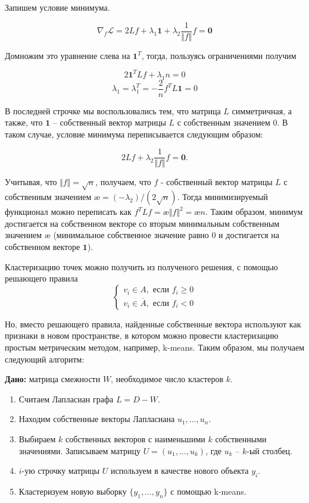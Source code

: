 \documentclass[12pt,a4paper]{article}
\begin{document}
Запишем условие минимума.

\begin{equation*}
	\nabla_f \mathcal{L} = 2Lf + \lambda_1 \mathbf{1} + \lambda_2 \frac{1}{\Vert f \Vert} f = \mathbf{0}
\end{equation*}

Домножим это уравнение слева на $\mathbf{1}^T$, тогда, пользуясь ограничениями получим

\begin{equation*}
	2\mathbf{1}^T Lf + \lambda_1 n = 0
\end{equation*}
\begin{equation*}
	\lambda_1 = \lambda_1^T = -\frac{2}{n} f^T L \mathbf{1} = 0
\end{equation*}

В последней строчке мы воспользовались тем, что матрица $L$ симметричная, а также, что $\mathbf{1}$ – собственный вектор матрицы $L$ с собственным значением $0$. В таком случае, условие минимума переписывается следующим образом:

\begin{equation*}
	2Lf + \lambda_2 \frac{1}{\Vert f \Vert} f = \mathbf{0}.
\end{equation*}

Учитывая, что $\Vert f \Vert = \sqrt{n}$, получаем, что $f$ - собственный вектор матрицы $L$ с собственным значением $æ = (-\lambda_2)/(2\sqrt{n})$. Тогда минимизируемый функционал можно переписать как $f^T L f = æ \Vert f \Vert^2 = æ n$. Таким образом, минимум достигается на собственном векторе со вторым минимальным собственным значением $æ$ (минимальное собственное значение равно $0$ и достигается на собственном векторе $\mathbf{1}$).

Кластеризацию точек можно получить из полученого решения, с помощью решающего правила
\begin{equation*}
	\begin{cases}
	v_i \in A, \text{ если } f_i \geq 0\\
	v_i \in \overline{A}, \text{ если } f_i < 0
	\end{cases}
\end{equation*}

Но, вместо решающего правила, найденные собственные вектора используют как признаки в новом пространстве, в котором можно провести кластеризацию простым метрическим методом, например, k-means. Таким образом, мы получаем следующий алгоритм:

\newpage
\textbf{Дано:} матрица смежности $W$, необходимое число кластеров $k$.
\begin{enumerate}
	\item Считаем Лапласиан графа $L = D - W$.
	\item Находим собственные векторы Лапласиана $u_1, \ldots, u_n$.
	\item Выбираем $k$ собственных векторов с наименьшими $k$ собственными значениями. Записываем матрицу $U = (u_1, \ldots, u_k)$, где $u_k$ – $k$-ый столбец.
	\item $i$-ую строчку матрицы $U$ используем в качестве нового объекта $y_i$.
	\item Кластеризуем новую выборку $\{y_1, \ldots, y_n\}$ с помощью k-means.
\end{enumerate}
\end{document}

